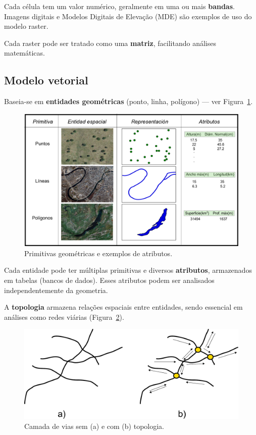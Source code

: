 Cada célula tem um valor numérico, geralmente em uma ou mais \textbf{bandas}. Imagens digitais e Modelos Digitais de Elevação (MDE) são exemplos de uso do modelo raster.

Cada raster pode ser tratado como uma \textbf{matriz}, facilitando análises matemáticas.

\subsection{Modelo vetorial}

Baseia-se em \textbf{entidades geométricas} (ponto, linha, polígono) — ver Figura~\ref{Fig:Primitivas_vectoriales}.

\begin{figure}[!hbt]   
\centering
\includegraphics[width=\textwidth]{dados/Primitivas_vectoriales.pdf}
\caption{\small Primitivas geométricas e exemplos de atributos.}
\label{Fig:Primitivas_vectoriales} 
\end{figure}

Cada entidade pode ter múltiplas primitivas e diversos \textbf{atributos}, armazenados em tabelas (bancos de dados). Esses atributos podem ser analisados independentemente da geometria.

A \textbf{topologia} armazena relações espaciais entre entidades, sendo essencial em análises como redes viárias (Figura~\ref{Fig:Topologia_vias}).

\begin{figure}[!hbt]   
\centering
\includegraphics[width=.8\columnwidth]{dados/Topologia_vias.pdf}
\caption{\small Camada de vias sem (a) e com (b) topologia.}
\label{Fig:Topologia_vias} 
\end{figure}

